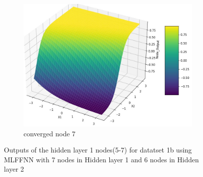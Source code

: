 \documentclass[11pt]{article}
\begin{document}
\begin{figure}[h!]
\begin{subfigure}[b]{0.45\textwidth}
	\includegraphics[scale=0.14]{hidden1_n7_c.jpg}
	\caption{converged node 7}
	\label{fig:fig2.1.5.15}
	\end{subfigure}
\caption{Outputs of the hidden layer 1 nodes(5-7) for datatset 1b using MLFFNN with 7 nodes in Hidden layer 1 and 6 nodes in Hidden layer 2}
\label{fig:fig2.1.5}
\end{figure}

\newpage
\end{document}
